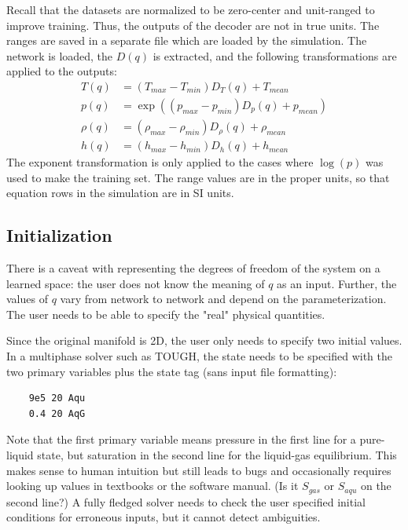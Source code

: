 \documentclass[]{article}
\begin{document}
Recall that the datasets are normalized to be zero-center and
unit-ranged to improve training. Thus, the outputs of the decoder are not in true
units.
The ranges are saved in a separate file which are loaded by the
simulation. The network is loaded, the $D(q)$ is extracted, and the following
transformations are applied to the outputs:
\begin{align}
T(q)      &= \left(T_{max}-T_{min}\right) D_T(q) +T_{mean} \\
p(q)      &= \exp\left(\left( p_{max}-p_{min}\right)
            D_p(q) +p_{mean} \right) \\
\rho(q) &= \left(\rho_{max}-\rho_{min}\right) D_{\rho}(q) +\rho_{mean}\\
h(q)      &= \left( h_{max}-h_{min}\right) D_h(q)  +h_{mean}
\end{align}
The exponent transformation is only applied to the cases where
$\log(p)$ was used to make the training set.
The range values are in the proper units, so that equation rows in the
simulation are in SI units.


\hypertarget{header-n3339}{%
\subsection{Initialization}\label{header-n3339}}

There is a caveat with representing the degrees of freedom of the system
on a learned space: the user does not know the meaning of $q$ as an
input. Further, the values of $q$ vary from network to network and
depend on the parameterization. The user needs to be able to specify the
"real" physical quantities.

Since the original manifold is 2D, the user only needs to specify two
initial values. In a multiphase solver such as TOUGH, the state needs
to be specified with the two primary variables plus the state tag (sans input file formatting): 
\begin{verbatim}
    9e5 20 Aqu
    0.4 20 AqG
\end{verbatim}
Note that the first primary variable means pressure in the first line
for a pure-liquid state,
but saturation in the second line for the liquid-gas equilibrium.
This makes sense to human intuition but
still leads to bugs and occasionally requires looking up values in
textbooks or the software manual. (Is it $S_{gas}$ or $S_{aqu}$ on the second
line?) A fully fledged solver needs to check the user specified
initial conditions for erroneous inputs, but it cannot detect ambiguities.
\end{document}
